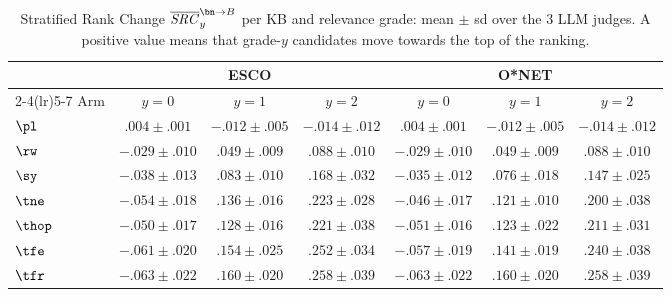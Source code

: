\begin{table}
\centering\scriptsize
\caption{Stratified Rank Change $\overline{\mathit{SRC}}^{\bn \rightarrow B}_y$ per KB and relevance grade: mean $\pm$ sd over the 3 LLM judges. A positive value means that grade-$y$ candidates move towards the top of the ranking.}
\label{tab:src-avg}
\begin{tabular*}{\columnwidth}{@{\extracolsep{\fill}}lcccccc}
\toprule
& \multicolumn{3}{c}{ESCO} & \multicolumn{3}{c}{O*NET} \\
\cmidrule(lr){2-4}\cmidrule(lr){5-7}
Arm & $y=0$ & $y=1$ & $y=2$ & $y=0$ & $y=1$ & $y=2$ \\
\midrule
$\pl$ & $.004 \pm .001$ & $-.012 \pm .005$ & $-.014 \pm .012$ & $.004 \pm .001$ & $-.012 \pm .005$ & $-.014 \pm .012$ \\
$\rw$ & $-.029 \pm .010$ & $.049 \pm .009$ & $.088 \pm .010$ & $-.029 \pm .010$ & $.049 \pm .009$ & $.088 \pm .010$ \\
$\sy$ & $-.038 \pm .013$ & $.083 \pm .010$ & $.168 \pm .032$ & $-.035 \pm .012$ & $.076 \pm .018$ & $.147 \pm .025$ \\
$\tne$ & $-.054 \pm .018$ & $.136 \pm .016$ & $.223 \pm .028$ & $-.046 \pm .017$ & $.121 \pm .010$ & $.200 \pm .038$ \\
$\thop$ & $-.050 \pm .017$ & $.128 \pm .016$ & $.221 \pm .038$ & $-.051 \pm .016$ & $.123 \pm .022$ & $.211 \pm .031$ \\
$\tfe$ & $-.061 \pm .020$ & $.154 \pm .025$ & $.252 \pm .034$ & $-.057 \pm .019$ & $.141 \pm .019$ & $.240 \pm .038$ \\
$\tfr$ & $-.063 \pm .022$ & $.160 \pm .020$ & $.258 \pm .039$ & $-.063 \pm .022$ & $.160 \pm .020$ & $.258 \pm .039$ \\
\bottomrule
\end{tabular*}
\end{table}
